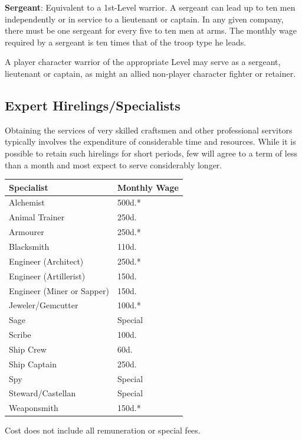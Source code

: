\documentclass{book}
\begin{document}
\textbf{Sergeant}: Equivalent to a 1st-Level warrior. A sergeant can
lead up to ten men independently or in service to a lieutenant or
captain. In any given company, there must be one sergeant for every five
to ten men at arms. The monthly wage required by a sergeant is ten times
that of the troop type he leads.

A player character warrior of the appropriate Level may serve as a
sergeant, lieutenant or captain, as might an allied non-player character
fighter or retainer.

\subsection*{Expert
Hirelings/Specialists}\label{expert-hirelingsspecialists}

Obtaining the services of very skilled craftsmen and other professional
servitors typically involves the expenditure of considerable time and
resources. While it is possible to retain such hirelings for short
periods, few will agree to a term of less than a month and most expect
to serve considerably longer.

\begin{table}[ht]
	\centering
	\begin{threeparttable}
	
		\begin{tabular}{ll}
			\toprule
				Specialist & Monthly Wage \\
			\midrule
			Alchemist & 500d.{*} \\
			Animal Trainer & 250d. \\
			Armourer & 250d.{*} \\
			Blacksmith & 110d. \\
			Engineer (Architect) & 250d.{*} \\
			Engineer (Artillerist) & 150d. \\
			Engineer (Miner or Sapper) & 150d. \\
			Jeweler/Gemcutter & 100d.{*} \\
			Sage & Special \\
			Scribe & 100d. \\
			Ship Crew & 60d. \\
			Ship Captain & 250d. \\
			Spy & Special \\
			Steward/Castellan & Special \\
			Weaponsmith & 150d.{*} \\
			\bottomrule
		\end{tabular}
		\begin{tablenotes}
			\item [*] Cost does not include all remuneration or special fees.
		\end{tablenotes}
	\end{threeparttable}
\end{table}
\end{document}
